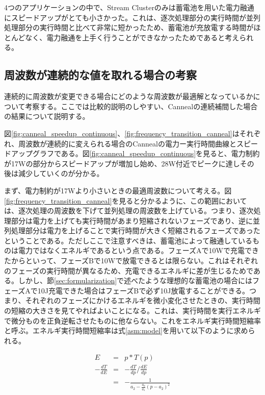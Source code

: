 4つのアプリケーションの中で、Stream Clusterのみは蓄電池を用いた電力融通にスピードアップがとても小さかった。これは、逐次処理部分の実行時間が並列処理部分の実行時間と比べて非常に短かったため、蓄電池が充放電する時間がほとんどなく、電力融通を上手く行うことができなかったためであると考えられる。

\subsection{周波数が連続的な値を取れる場合の考察}
\label{subsec:continuous}

連続的に周波数が変更できる場合にどのような周波数が最適解となっているかについて考察する。ここでは比較的説明のしやすい、Cannealの連続補間した場合の結果について説明する。

図\ref{fig:canneal_speedup_continuous}、\ref{fig:frequency_transition_canneal}はそれぞれ、周波数が連続的に変えられる場合のCannealの電力ー実行時間曲線とスピードアップグラフである。図\ref{fig:canneal_speedup_continuous}を見ると、電力制約が17Wの部分からスピードアップが増加し始め、28W付近でピークに達しその後は減少していくのが分かる。

まず、電力制約が17Wより小さいときの最適周波数について考える。図\ref{fig:frequency_transition_canneal}を見ると分かるように、この範囲においては、逐次処理の周波数を下げて並列処理の周波数を上げている。つまり、逐次処理部分は電力を上げても実行時間があまり短縮されないフェーズであり、逆に並列処理部分は電力を上げることで実行時間が大きく短縮されるフェーズであったということである。ただしここで注意すべきは、蓄電池によって融通しているものは電力ではなくエネルギであるという点である。フェーズAで10Wで充電できたからといって、フェーズBで10Wで放電できるとは限らない。これはそれぞれのフェーズの実行時間が異なるため、充電できるエネルギに差が生じるためである。しかし、節\ref{sec:formularization}で述べたような理想的な蓄電池の場合にはフェーズAで10J充電できた場合はフェーズBで必ず10J放電することができる。つまり、それぞれのフェーズにかけるエネルギを微小変化させたときの、実行時間の短縮の大きさを見てやればよいことになる。これは、実行時間を実行エネルギで微分ものを正負逆転させたものに他ならない。これをエネルギ実行時間短縮率と呼ぶ。エネルギ実行時間短縮率は式\ref{asm:model}を用いて以下のように求められる。

\begin{eqnarray}
E &=& p * T(p)\\
-\frac{dT}{dE} &=& -\frac{dT}{dp} / \frac{dE}{dp}\\
&=& -\frac{1}{a_2 - \frac{a_0}{a_1}( p-a_2)^2} \label{asm:differential}
\end{eqnarray}


